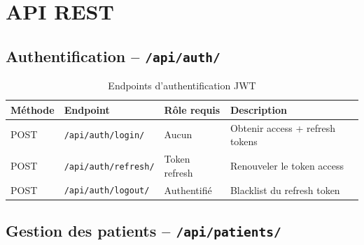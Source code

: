\documentclass[12pt,a4paper]{report}
\begin{document}
\chapter{API REST}

\section{Authentification -- \texttt{/api/auth/}}

\begin{table}[H]
\centering
\caption{Endpoints d'authentification JWT}
\renewcommand{\arraystretch}{1.4}
\begin{tabular}{|p{1.5cm}|p{4cm}|p{2.5cm}|p{5cm}|}
  \hline
  \rowcolor{medaccent}
  \textbf{Méthode} & \textbf{Endpoint} & \textbf{Rôle requis} & \textbf{Description} \\
  \hline
  POST & \texttt{/api/auth/login/} & Aucun & Obtenir access + refresh tokens \\
  \hline
  POST & \texttt{/api/auth/refresh/} & Token refresh & Renouveler le token access \\
  \hline
  POST & \texttt{/api/auth/logout/} & Authentifié & Blacklist du refresh token \\
  \hline
\end{tabular}
\end{table}

\section{Gestion des patients -- \texttt{/api/patients/}}
\end{document}
